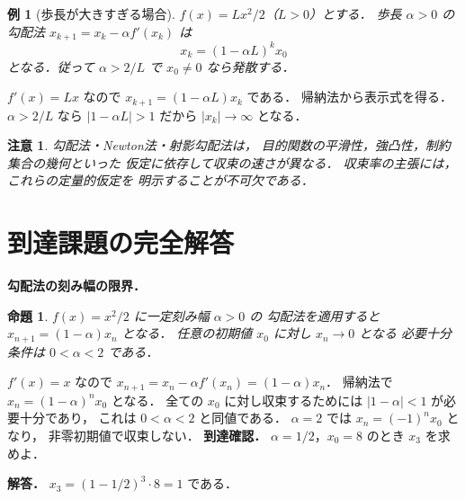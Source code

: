 \documentclass[a5paper,10pt,onecolumn]{jsarticle}
\makeatletter
\theoremstyle{mathnotetheorem}
\newtheorem{proposition}[theorem]{命題}
\newtheorem{example}[theorem]{例}
\newtheorem{remark}[theorem]{注意}
\renewcommand{\proofname}{証明}
\renewenvironment{proof}[1][\proofname]{%
  \par\pushQED{\qed}\normalfont\topsep4\p@\@plus2\p@\relax
  \trivlist\item[\hskip\labelsep\bfseries #1]\ignorespaces
}{\popQED\endtrivlist\@endpefalse}
\makeatother
\begin{document}
\begin{example}[歩長が大きすぎる場合]
$f(x)=Lx^2/2$（$L>0$）とする．
歩長 $\alpha>0$ の勾配法
$x_{k+1}=x_k-\alpha f'(x_k)$ は
\[
 x_k=(1-\alpha L)^kx_0
\]
となる．従って
$\alpha>2/L$ で $x_0\ne0$ なら発散する．
\end{example}
\begin{proof}
$f'(x)=Lx$ なので
$x_{k+1}=(1-\alpha L)x_k$ である．
帰納法から表示式を得る．
$\alpha>2/L$ なら
$|1-\alpha L|>1$ だから
$|x_k|\to\infty$ となる．
\end{proof}

\begin{remark}
勾配法・Newton法・射影勾配法は，
目的関数の平滑性，強凸性，制約集合の幾何といった
仮定に依存して収束の速さが異なる．
収束率の主張には，これらの定量的仮定を
明示することが不可欠である．
\end{remark}

\section{到達課題の完全解答}
\noindent\textbf{勾配法の刻み幅の限界．}
\begin{proposition}
$f(x)=x^2/2$ に一定刻み幅 $\alpha>0$ の
勾配法を適用すると
$x_{n+1}=(1-\alpha)x_n$ となる．
任意の初期値 $x_0$ に対し $x_n\to0$ となる
必要十分条件は $0<\alpha<2$ である．
\end{proposition}
\begin{proof}
$f'(x)=x$ なので
$x_{n+1}=x_n-\alpha f'(x_n)=(1-\alpha)x_n$．
帰納法で $x_n=(1-\alpha)^nx_0$ となる．
全ての $x_0$ に対し収束するためには
$|1-\alpha|<1$ が必要十分であり，
これは $0<\alpha<2$ と同値である．
$\alpha=2$ では $x_n=(-1)^nx_0$ となり，
非零初期値で収束しない．
\end{proof}
\noindent\textbf{到達確認．}
$\alpha=1/2$，$x_0=8$ のとき $x_3$ を求めよ．
\par\noindent\textbf{解答．}
$x_3=(1-1/2)^3\cdot8=1$ である．
\end{document}
